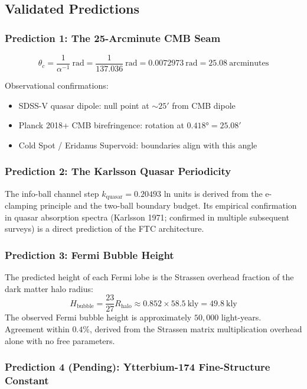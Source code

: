 \documentclass[11pt,a4paper]{article}
\begin{document}
\subsection{Validated Predictions}

\subsubsection{Prediction 1: The 25-Arcminute CMB Seam}

\[
  \theta_c = \frac{1}{\alpha^{-1}}\ \text{rad}
    = \frac{1}{137.036}\ \text{rad}
    = 0.0072973\ \text{rad}
    = 25.08\ \text{arcminutes}
\]

Observational confirmations:
\begin{itemize}
  \item SDSS-V quasar dipole: null point at $\sim25'$ from CMB dipole
  \item Planck 2018+ CMB birefringence: rotation at $0.418° = 25.08'$
  \item Cold Spot / Eridanus Supervoid: boundaries align with this angle
\end{itemize}

\subsubsection{Prediction 2: The Karlsson Quasar Periodicity}

The info-ball channel step $k_{\text{quasar}} = 0.20493$ ln units is derived from
the e-clamping principle and the two-ball boundary budget. Its empirical
confirmation in quasar absorption spectra (Karlsson 1971; confirmed in multiple
subsequent surveys) is a direct prediction of the FTC architecture.

\subsubsection{Prediction 3: Fermi Bubble Height}

The predicted height of each Fermi lobe is the Strassen overhead fraction of the
dark matter halo radius:
\[
  H_{\text{bubble}} = \frac{23}{27} R_{\text{halo}}
    \approx 0.852 \times 58.5\ \text{kly}
    = \boxed{49.8\ \text{kly}}
\]
The observed Fermi bubble height is approximately $50{,}000$ light-years. Agreement
within $0.4\%$, derived from the Strassen matrix multiplication overhead alone with
no free parameters.

\subsubsection{Prediction 4 (Pending): Ytterbium-174 Fine-Structure Constant}
\end{document}

